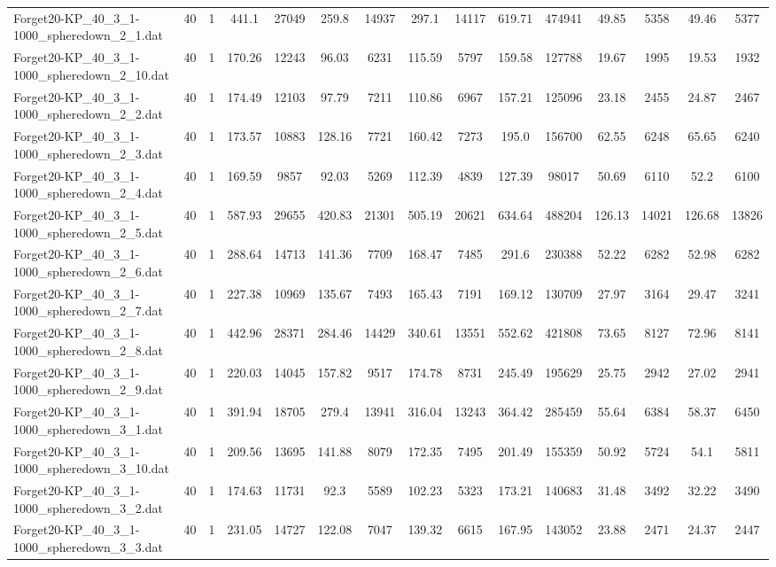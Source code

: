 \begin{table}[!ht]
{\begin{tabular}{lcccccccccccccc}
Forget20-KP\_40\_3\_1-1000\_spheredown\_2\_1.dat & 40 & 1 & 441.1 & 27049 & 259.8 & 14937 & 297.1 & 14117 & 619.71 & 474941 & 49.85 & 5358 & 49.46 & 5377 \\
Forget20-KP\_40\_3\_1-1000\_spheredown\_2\_10.dat & 40 & 1 & 170.26 & 12243 & 96.03 & 6231 & 115.59 & 5797 & 159.58 & 127788 & 19.67 & 1995 & 19.53 & 1932 \\
Forget20-KP\_40\_3\_1-1000\_spheredown\_2\_2.dat & 40 & 1 & 174.49 & 12103 & 97.79 & 7211 & 110.86 & 6967 & 157.21 & 125096 & 23.18 & 2455 & 24.87 & 2467 \\
Forget20-KP\_40\_3\_1-1000\_spheredown\_2\_3.dat & 40 & 1 & 173.57 & 10883 & 128.16 & 7721 & 160.42 & 7273 & 195.0 & 156700 & 62.55 & 6248 & 65.65 & 6240 \\
Forget20-KP\_40\_3\_1-1000\_spheredown\_2\_4.dat & 40 & 1 & 169.59 & 9857 & 92.03 & 5269 & 112.39 & 4839 & 127.39 & 98017 & 50.69 & 6110 & 52.2 & 6100 \\
Forget20-KP\_40\_3\_1-1000\_spheredown\_2\_5.dat & 40 & 1 & 587.93 & 29655 & 420.83 & 21301 & 505.19 & 20621 & 634.64 & 488204 & 126.13 & 14021 & 126.68 & 13826 \\
Forget20-KP\_40\_3\_1-1000\_spheredown\_2\_6.dat & 40 & 1 & 288.64 & 14713 & 141.36 & 7709 & 168.47 & 7485 & 291.6 & 230388 & 52.22 & 6282 & 52.98 & 6282 \\
Forget20-KP\_40\_3\_1-1000\_spheredown\_2\_7.dat & 40 & 1 & 227.38 & 10969 & 135.67 & 7493 & 165.43 & 7191 & 169.12 & 130709 & 27.97 & 3164 & 29.47 & 3241 \\
Forget20-KP\_40\_3\_1-1000\_spheredown\_2\_8.dat & 40 & 1 & 442.96 & 28371 & 284.46 & 14429 & 340.61 & 13551 & 552.62 & 421808 & 73.65 & 8127 & 72.96 & 8141 \\
Forget20-KP\_40\_3\_1-1000\_spheredown\_2\_9.dat & 40 & 1 & 220.03 & 14045 & 157.82 & 9517 & 174.78 & 8731 & 245.49 & 195629 & 25.75 & 2942 & 27.02 & 2941 \\
Forget20-KP\_40\_3\_1-1000\_spheredown\_3\_1.dat & 40 & 1 & 391.94 & 18705 & 279.4 & 13941 & 316.04 & 13243 & 364.42 & 285459 & 55.64 & 6384 & 58.37 & 6450 \\
Forget20-KP\_40\_3\_1-1000\_spheredown\_3\_10.dat & 40 & 1 & 209.56 & 13695 & 141.88 & 8079 & 172.35 & 7495 & 201.49 & 155359 & 50.92 & 5724 & 54.1 & 5811 \\
Forget20-KP\_40\_3\_1-1000\_spheredown\_3\_2.dat & 40 & 1 & 174.63 & 11731 & 92.3 & 5589 & 102.23 & 5323 & 173.21 & 140683 & 31.48 & 3492 & 32.22 & 3490 \\
Forget20-KP\_40\_3\_1-1000\_spheredown\_3\_3.dat & 40 & 1 & 231.05 & 14727 & 122.08 & 7047 & 139.32 & 6615 & 167.95 & 143052 & 23.88 & 2471 & 24.37 & 2447 \\

\end{tabular}}
\end{table}
